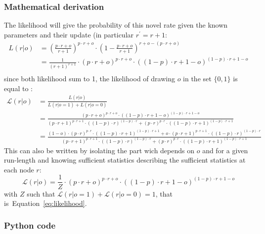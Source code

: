\documentclass[12pt,english]{article}%
\newcommand{\eql}[1]{\begin{equation}#1\end{equation}}
\newcommand{\eqs}[1]{\begin{align*}#1\end{align*}}
\newcommand{\Ll}{\mathcal{L}}
\newcommand{\seeEq}[1]{Equation~\ref{eq:#1}}
\begin{document}
\subsubsection{Mathematical derivation}

The likelihood will give the probability of this novel rate given the known parameters and their update (in particular $r^{'}=r+1$:
\eqs{
L(r | o)&={(\frac{p\cdot r + o}{r+1})}^{p\cdot r + o} \cdot (1-\frac{p\cdot r + o}{r+1})^{r + o - (p\cdot r + o)} \\
&= \frac{1}{({r+1})^{r+1}} \cdot {(p\cdot r + o)}^{p\cdot r + o}  \cdot {((1- p)\cdot r + 1- o)}^{(1- p)\cdot r + 1- o} \\
}
since both likelihood sum to 1, the likelihood of drawing $o$ in the set $\{ 0, 1 \}$   is equal to :
\eqs{
\Ll(r | o)&=\frac{L(r | o)}{L(r | o=1) + L(r | o=0)}  \\
&= \frac{ {(p\cdot r + o)}^{p\cdot r + o}  \cdot {((1- p)\cdot r + 1- o)}^{(1- p)\cdot r + 1- o} }{
 {(p\cdot r + 1)}^{p\cdot r + 1}  \cdot {((1- p)\cdot r )}^{(1- p)\cdot r }  +
  {(p\cdot r )}^{p\cdot r }  \cdot {((1- p)\cdot r + 1)}^{(1- p)\cdot r + 1}
}  \\
&= \frac{ (1-o) \cdot {(p\cdot r)}^{p\cdot r}  \cdot {((1- p)\cdot r + 1)}^{(1- p)\cdot r + 1}
+ o \cdot {(p\cdot r + 1)}^{p\cdot r + 1}  \cdot {((1- p)\cdot r)}^{(1- p)\cdot r}
 }{
 {(p\cdot r + 1)}^{p\cdot r + 1}  \cdot {((1- p)\cdot r )}^{(1- p)\cdot r }  +
  {(p\cdot r )}^{p\cdot r }  \cdot {((1- p)\cdot r + 1)}^{(1- p)\cdot r + 1}
}  
}
This can also be written by isolating the part wich depends on $o$ and for a given run-length and knowing sufficient statistics describing the sufficient statistics at each node $r$:
\eql{
\Ll(r | o) = \frac{1}{Z} \cdot {(p \cdot r + o)}^{p \cdot r + o} \cdot {((1- p)\cdot r + 1- o)}^{(1- p)\cdot r + 1- o}
\label{eq:likelihood}
}
with $Z$ such that $\Ll(r | o=1) + \Ll(r | o=0)=1$, that is~\seeEq{likelihood}.

\subsubsection{Python code}
\end{document}

